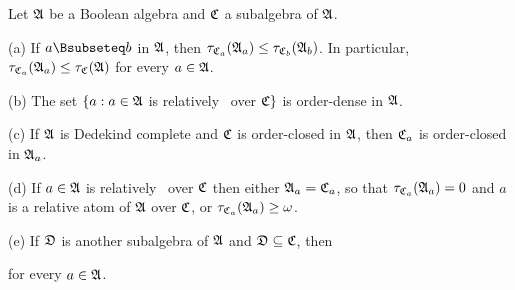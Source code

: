  Let $\frak A$ be a Boolean algebra and $\frak C$ a
subalgebra of $\frak A$.

(a) If $a\Bsubseteq b$ in $\frak A$, then
$\tau_{\frak C_a}(\frak A_a)\le\tau_{\frak C_b}(\frak A_b)$.
In particular, $\tau_{\frak C_a}(\frak A_a)\le\tau_{\frak C}(\frak A)$
for every $a\in\frak A$.

(b) The set $\{a:a\in\frak A$ is relatively \Mth\ over
$\frak C\}$ is order-dense in $\frak A$.

(c) If $\frak A$ is Dedekind complete and $\frak C$ is order-closed in
$\frak A$, then $\frak C_a$ is order-closed in $\frak A_a$.

(d) If $a\in\frak A$ is relatively \Mth\ over $\frak C$
then either $\frak A_a=\frak C_a$, so that
$\tau_{\frak C_a}(\frak A_a)=0$ and $a$ is a relative atom of $\frak A$
over $\frak C$, or
$\tau_{\frak C_a}(\frak A_a)\ge\omega$.

(e) If $\frak D$ is another subalgebra of $\frak A$ and
$\frak D\subseteq\frak C$, then


\noindent for every $a\in\frak A$.

